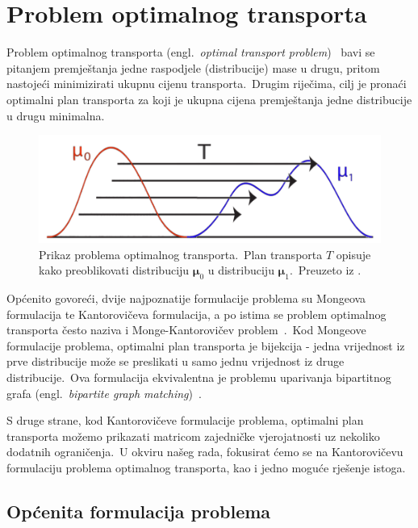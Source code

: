 \documentclass[diplomskirad]{fer}
\begin{document}
\chapter{Problem optimalnog transporta}
\label{pog:transport}

Problem optimalnog transporta (engl.\ \textit{optimal transport problem})~\cite{peyre2019computational} bavi se pitanjem premještanja jedne raspodjele (distribucije) mase u drugu, pritom nastojeći minimizirati ukupnu cijenu transporta.\ 
Drugim riječima, cilj je pronaći optimalni plan transporta za koji je ukupna cijena premještanja jedne distribucije u drugu minimalna.\ 

\begin{figure}[h]
  \centering
  \includegraphics[scale=0.75]{./Slike/optimalni_transport.png}
  \caption{Prikaz problema optimalnog transporta.\ Plan transporta $T$ opisuje kako preoblikovati distribuciju $\bm{\mu}_0$ u distribuciju $\bm{\mu}_1$.\ Preuzeto iz \cite{papadakis2015optimal}.}
  \label{fig:ot_problem}
\end{figure}
  
Općenito govoreći, dvije najpoznatije formulacije problema su Mongeova formulacija te Kantorovičeva formulacija, a po istima se problem optimalnog transporta često naziva i Monge-Kantorovičev problem~\cite{bogachev2012monge}.\ 
Kod Mongeove formulacije problema, optimalni plan transporta je bijekcija - jedna vrijednost iz prve distribucije može se preslikati u samo jednu vrijednost iz druge distribucije.\ 
Ova formulacija ekvivalentna je problemu uparivanja bipartitnog grafa (engl.\ \textit{bipartite graph matching})~\cite{karp1990optimal}.\ 
  
S druge strane, kod Kantorovičeve formulacije problema, optimalni plan transporta možemo prikazati matricom zajedničke vjerojatnosti uz nekoliko dodatnih ograničenja.\ 
U okviru našeg rada, fokusirat ćemo se na Kantorovičevu formulaciju problema optimalnog transporta, kao i jedno moguće rješenje istoga.\

\section{Općenita formulacija problema}
\label{sek:transport}
\end{document}
